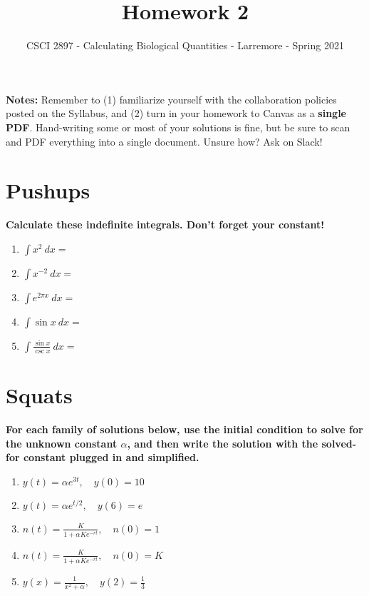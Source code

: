 \documentclass[11pt,onecolumn,superscriptaddress,notitlepage]{article}
\date{}
\begin{document}
\author{CSCI 2897 - Calculating Biological Quantities - Larremore - Spring 2021}
\title{Homework 2}
\maketitle

{\bf Notes:} Remember to (1) familiarize yourself with the collaboration policies posted on the Syllabus, and (2) turn in your homework to Canvas as a {\bf single PDF}. Hand-writing some or most of your solutions is fine, but be sure to scan and PDF everything into a single document. Unsure how? Ask on Slack! 

\section*{Pushups}

{\bf Calculate these indefinite integrals. Don't forget your constant!} 

\begin{enumerate}
	\item $\displaystyle\int x^2\ dx=$
	\item $\displaystyle\int x^{-2}\ dx = $
	\item $\displaystyle\int e^{2 \pi x}\ dx = $
	\item $\displaystyle\int \sin{x}\ dx = $
	\item $\displaystyle\int \frac{\sin{x}}{\csc{x}}\ dx = $
\end{enumerate}

\section*{Squats} 

{\bf For each family of solutions below, use the initial condition to solve for the unknown constant $\alpha$, and then write the solution with the solved-for constant plugged in and simplified.}

\begin{enumerate}[resume]
	\item $y(t) = \alpha e^{3t}, \quad y(0) = 10 $
	\item $y(t) = \alpha e^{t/2}, \quad y(6) = e $
	\item $\displaystyle n(t) = \frac{K}{1+\alpha Ke^{-r t}}, \quad n(0) = 1$
	\item $\displaystyle n(t) = \frac{K}{1+ \alpha Ke^{-r t}}, \quad n(0) = K$
	\item $\displaystyle y(x) = \frac{1}{x^2 + \alpha}, \quad y(2) = \frac{1}{3}$  
\end{enumerate}
\end{document}
